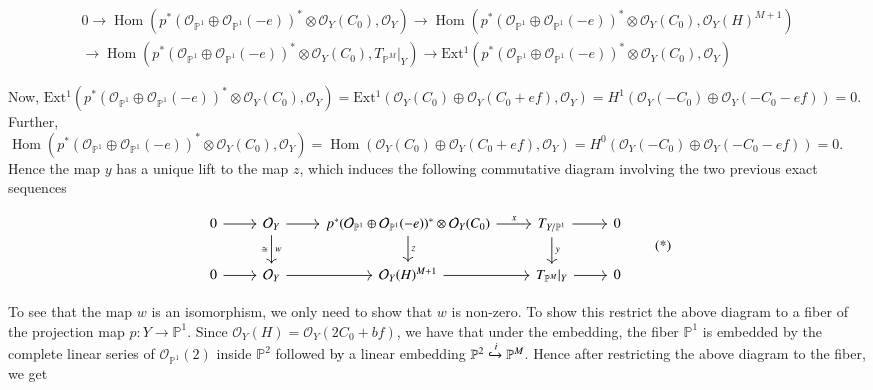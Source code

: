 \documentclass[11pt,twoside]{amsart}
\theoremstyle{plain}
\numberwithin{equation}{section}
\theoremstyle{definition}
\begin{document}
\begin{multline*}
0 \to \operatorname{Hom}(p^*(\mathcal{O}_{\mathbb{P}^1} \oplus \mathcal{O}_{\mathbb{P}^1}(-e))^* \otimes \mathcal{O}_{Y}(C_0), \mathcal{O}_Y) \to \operatorname{Hom}(p^*(\mathcal{O}_{\mathbb{P}^1} \oplus \mathcal{O}_{\mathbb{P}^1}(-e))^* \otimes \mathcal{O}_{Y}(C_0), \mathcal{O}_Y(H)^{M+1}) \\ \to \operatorname{Hom}(p^*(\mathcal{O}_{\mathbb{P}^1} \oplus \mathcal{O}_{\mathbb{P}^1}(-e))^* \otimes \mathcal{O}_Y(C_0), T_{\mathbb{P}^M}|_Y) \to \operatorname{Ext^1}(p^*(\mathcal{O}_{\mathbb{P}^1} \oplus \mathcal{O}_{\mathbb{P}^1}(-e))^* \otimes \mathcal{O}_Y(C_0), \mathcal{O}_Y)
\end{multline*}

Now, $\operatorname{Ext^1}(p^*(\mathcal{O}_{\mathbb{P}^1} \oplus \mathcal{O}_{\mathbb{P}^1}(-e))^* \otimes \mathcal{O}_Y(C_0), \mathcal{O}_Y) = \operatorname{Ext^1}(\mathcal{O}_Y(C_0) \oplus \mathcal{O}_Y(C_0+ef), \mathcal{O}_Y) = H^1(\mathcal{O}_Y(-C_0) \oplus \mathcal{O}_Y(-C_0-ef)) = 0$.
Further, $\operatorname{Hom}(p^*(\mathcal{O}_{\mathbb{P}^1} \oplus \mathcal{O}_{\mathbb{P}^1}(-e))^* \otimes \mathcal{O}_Y(C_0), \mathcal{O}_Y) = \operatorname{Hom}(\mathcal{O}_Y(C_0) \oplus \mathcal{O}_Y(C_0+ef), \mathcal{O}_Y) = H^0(\mathcal{O}_Y(-C_0) \oplus \mathcal{O}_Y(-C_0-ef)) = 0$. Hence the map $y$ has a unique lift to the map $z$, which induces the following commutative diagram involving the two previous exact sequences

\begin{equation}
\begin{tikzcd}
  0 \arrow[r] & \mathcal{O}_Y \arrow[r] \arrow[d, "w", "\cong"'] & p^*(\mathcal{O}_{\mathbb{P}^1} \oplus \mathcal{O}_{\mathbb{P}^1}(-e))^* \otimes \mathcal{O}_Y(C_0) \arrow[r, "x"] \arrow[d, "z"] & T_{Y/\mathbb{P}^1} \arrow[r] \arrow[d, "y"] & 0 \\
   0 \arrow[r] & \mathcal{O}_Y \arrow[r] & \mathcal{O}_Y(H)^{M+1} \arrow[r] & T_{\mathbb{P}^M}|_Y \arrow[r] & 0
\end{tikzcd}
\tag{*}\label{diag:star}
\end{equation}

To see that the map $w$ is an isomorphism, we only need to show that $w$ is non-zero. To show this restrict the above diagram to a fiber of the projection map $p: Y \to \mathbb{P}^1$. Since $\mathcal{O}_Y(H) = \mathcal{O}_Y(2C_0+bf)$, we have that under the embedding, the fiber $\mathbb{P}^1$ is embedded by the complete linear series of $\mathcal{O}_{\mathbb{P}^1}(2)$ inside $\mathbb{P}^2$ followed \textcolor{black}{by} a linear embedding $\mathbb{P}^2 \xhookrightarrow{i} \mathbb{P}^M$. Hence after restricting the above diagram to the fiber, we get
\end{document}
